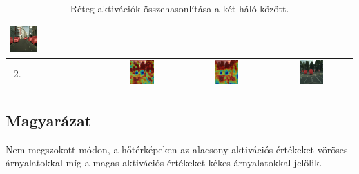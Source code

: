 \documentclass[12pt,oneside,a4paper]{article}
\theoremstyle{remark}
\begin{document}
\begin{table}[h!]
\begin{tabular}{|p{}|c|c|c|}
			\includegraphics[width=0.316\textwidth]{bonn_000002_000019_leftImg8bit} \\
			\hline
			-2.&\includegraphics[width=0.316\textwidth]{old_layer-2} &
			\includegraphics[width=0.316\textwidth]{new_l-2} &
			\includegraphics[width=0.316\textwidth]{bonn_000001_000019_leftImg8bit} \\
			\hline
		\end{tabular}
		\caption{Réteg aktivációk összehasonlítása a két háló között.}
		\label{tab:Activations}
	\end{table}
	
	
	\subsection{Magyarázat}\label{subsec:magyarazat}
	Nem megszokott módon, a hőtérképeken az alacsony aktivációs értékeket vöröses árnyalatokkal míg a magas aktivációs értékeket
	kékes árnyalatokkal jelölik.
	
\end{document}
